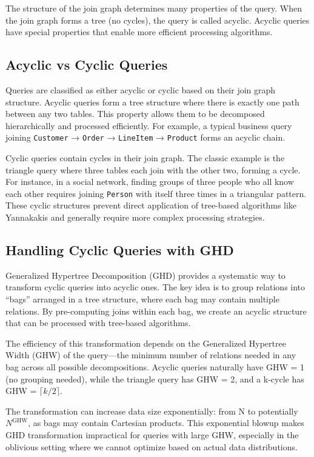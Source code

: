 The structure of the join graph determines many properties of the query. When the join graph forms a tree (no cycles), the query is called acyclic. Acyclic queries have special properties that enable more efficient processing algorithms.

\subsection{Acyclic vs Cyclic Queries}

Queries are classified as either acyclic or cyclic based on their join graph structure. Acyclic queries form a tree structure where there is exactly one path between any two tables. This property allows them to be decomposed hierarchically and processed efficiently. For example, a typical business query joining \texttt{Customer} → \texttt{Order} → \texttt{LineItem} → \texttt{Product} forms an acyclic chain.

Cyclic queries contain cycles in their join graph. The classic example is the triangle query where three tables each join with the other two, forming a cycle. For instance, in a social network, finding groups of three people who all know each other requires joining \texttt{Person} with itself three times in a triangular pattern. These cyclic structures prevent direct application of tree-based algorithms like Yannakakis and generally require more complex processing strategies.

\subsection{Handling Cyclic Queries with GHD}

Generalized Hypertree Decomposition (GHD) provides a systematic way to transform cyclic queries into acyclic ones. The key idea is to group relations into ``bags'' arranged in a tree structure, where each bag may contain multiple relations. By pre-computing joins within each bag, we create an acyclic structure that can be processed with tree-based algorithms.

The efficiency of this transformation depends on the Generalized Hypertree Width (GHW) of the query---the minimum number of relations needed in any bag across all possible decompositions. Acyclic queries naturally have GHW = 1 (no grouping needed), while the triangle query has GHW = 2, and a k-cycle has GHW = $\lceil k/2\rceil$. 

The transformation can increase data size exponentially: from N to potentially $N^{\text{GHW}}$, as bags may contain Cartesian products. This exponential blowup makes GHD transformation impractical for queries with large GHW, especially in the oblivious setting where we cannot optimize based on actual data distributions.
